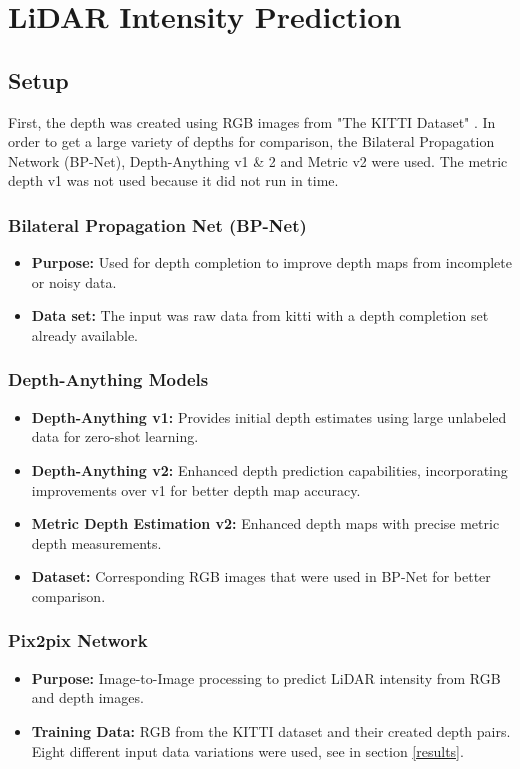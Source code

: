 \chapter{LiDAR Intensity Prediction} %
\section{Setup}
First, the depth was created using RGB images from "The KITTI Dataset" \cite{Geiger2013IJRR}. In order to get a large variety of depths for comparison, the Bilateral Propagation Network (BP-Net), Depth-Anything v1 \& 2 and Metric v2 were used. The metric depth v1 was not used because it did not run in time.
\subsection{Bilateral Propagation Net (BP-Net)}
\begin{itemize}
	\item \textbf{Purpose:} Used for depth completion to improve depth maps from incomplete or noisy data.
	\item \textbf{Data set:} The input was raw data from kitti with a depth completion set already available. 
\end{itemize}

\subsection{Depth-Anything Models}
\begin{itemize}
	\item \textbf{Depth-Anything v1:} Provides initial depth estimates using large unlabeled data for zero-shot learning.
	\item \textbf{Depth-Anything v2:} Enhanced depth prediction capabilities, incorporating improvements over v1 for better depth map accuracy.


 	\item \textbf {Metric Depth Estimation v2:} Enhanced depth maps with precise metric depth measurements.

	\item \textbf{Dataset:} Corresponding RGB images that were used in BP-Net for better comparison.
\end{itemize}

\subsection{Pix2pix Network}
\begin{itemize}
	\item \textbf{Purpose:} Image-to-Image processing to predict LiDAR intensity from RGB and depth images. 
	\item \textbf{Training Data:} RGB from the KITTI dataset and their created depth pairs.
	Eight different input data variations were used, see in section \ref{results}.
\end{itemize}

